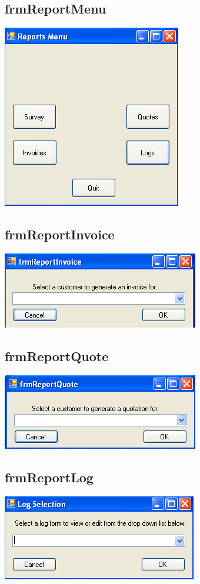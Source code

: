 \subsection{frmReportMenu}
	\includegraphics[scale=0.5]{frmReportMenu_scrot}
	
	
\subsection{frmReportInvoice}
	\includegraphics[scale=0.5]{frmReportInvoice_scrot}
	
	
\subsection{frmReportQuote}
	\includegraphics[scale=0.5]{frmReportQuote_scrot}
	

\subsection{frmReportLog}
	\includegraphics[scale=0.5]{frmReportLog_scrot}
	
	
